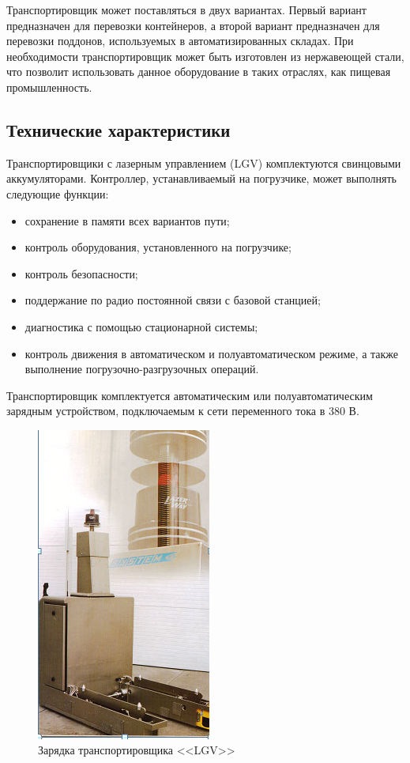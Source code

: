 Транспортировщик может поставляться в двух вариантах. Первый вариант предназначен для перевозки контейнеров, а второй вариант предназначен для перевозки поддонов, используемых в автоматизированных складах. При необходимости транспортировщик может быть изготовлен из нержавеющей стали, что позволит использовать данное оборудование в таких отраслях, как пищевая промышленность.

\subsection*{Технические характеристики}

Транспортировщики с лазерным управлением (LGV) комплектуются свинцовыми аккумуляторами. Контроллер, устанавливаемый на погрузчике, может выполнять следующие функции:

\begin{itemize}
    \item сохранение в памяти всех вариантов пути;
    \item контроль оборудования, установленного на погрузчике;
    \item контроль безопасности;
    \item поддержание по радио постоянной связи с базовой станцией;
    \item диагностика с помощью стационарной системы;
    \item контроль движения в автоматическом и полуавтоматическом режиме, а также выполнение погрузочно-разгрузочных операций.
\end{itemize}

Транспортировщик комплектуется автоматическим или полуавтоматическим зарядным устройством, подключаемым к сети переменного тока в 380 В.

\begin{figure}[ht]
    \includegraphics[width=.3\linewidth]{Figures/charging.png}
    \caption{Зарядка транспортировщика <<LGV>>}
    \label{fig:charging}
\end{figure}

